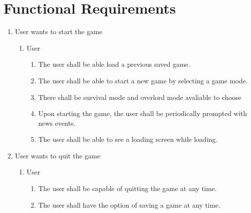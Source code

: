 \documentclass[]{article}
\begin{document}
\section{Functional Requirements}
\label{sec:functional_requirements}
\begin{enumerate}[{BE}1.]


    \item User wants to start the game
    \begin{enumerate}[{VP1}.1]
      \item User
      \begin{enumerate}
        \item The user shall be able load a previous saved game.
        \item The user shall be able to start a new game by selecting a game mode.
        \item There shall be survival mode and overlord mode avaliable to choose
        \item Upon starting the game, the user shall be periodically prompted with news events.
        \item The user shall be able to see a loading screen while loading.
      \end{enumerate}
    \end{enumerate}

    \item User wants to quit the game
    \begin{enumerate}[{VP1}.1]
      \item User
      \begin{enumerate}
        \item The user shall be capable of quitting the game at any time.
        \item The user shall have the option of saving a game at any time.
      \end{enumerate}
    \end{enumerate}


\end{enumerate}
\end{document}
